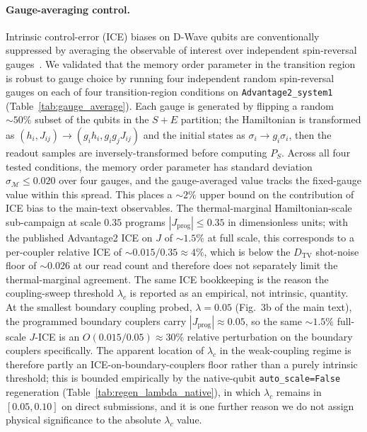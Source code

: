 \documentclass[aps,prapplied,reprint,superscriptaddress,floatfix,nofootinbib]{revtex4-2}
\begin{document}
\paragraph{Gauge-averaging control.}
Intrinsic control-error (ICE) biases on D-Wave qubits are conventionally suppressed by averaging the observable of interest over independent spin-reversal gauges~\cite{dwave2024system_docs}.
We validated that the memory order parameter in the transition region is robust to gauge choice by running four independent random spin-reversal gauges on each of four transition-region conditions on \texttt{Advantage2\_system1} (Table~\ref{tab:gauge_average}).
Each gauge is generated by flipping a random $\sim 50\%$ subset of the qubits in the $S{+}E$ partition; the Hamiltonian is transformed as $(h_i, J_{ij}) \to (g_i h_i, g_i g_j J_{ij})$ and the initial states as $\sigma_i\to g_i\sigma_i$, then the readout samples are inversely-transformed before computing $P_S$.
Across all four tested conditions, the memory order parameter has standard deviation $\sigma_\mathcal{M}\le 0.020$ over four gauges, and the gauge-averaged value tracks the fixed-gauge value within this spread.
This places a $\sim 2\%$ upper bound on the contribution of ICE bias to the main-text observables.
The thermal-marginal Hamiltonian-scale sub-campaign at scale $0.35$ programs $|J_\mathrm{prog}|\le 0.35$ in dimensionless units; with the published Advantage2 ICE on $J$ of $\sim 1.5\%$ at full scale, this corresponds to a per-coupler relative ICE of $\sim 0.015/0.35\approx 4\%$, which is below the $D_\mathrm{TV}$ shot-noise floor of $\sim 0.026$ at our read count and therefore does not separately limit the thermal-marginal agreement.
The same ICE bookkeeping is the reason the coupling-sweep threshold $\lambda_c$ is reported as an empirical, not intrinsic, quantity.  At the smallest boundary coupling probed, $\lambda=0.05$ (Fig.~3b of the main text), the programmed boundary couplers carry $|J_\mathrm{prog}|\approx 0.05$, so the same $\sim 1.5\%$ full-scale $J$-ICE is an $O(0.015/0.05)\approx 30\%$ relative perturbation on the boundary couplers specifically.  The apparent location of $\lambda_c$ in the weak-coupling regime is therefore partly an ICE-on-boundary-couplers floor rather than a purely intrinsic threshold; this is bounded empirically by the native-qubit \texttt{auto\_scale=False} regeneration (Table~\ref{tab:regen_lambda_native}), in which $\lambda_c$ remains in $[0.05,0.10]$ on direct submissions, and it is one further reason we do not assign physical significance to the absolute $\lambda_c$ value.
\end{document}
